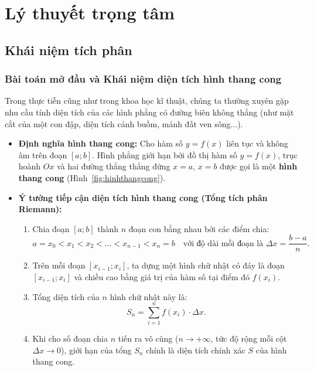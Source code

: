 \documentclass[12pt]{article}
\begin{document}
	\newpage
	
	\setcounter{tocdepth}{2}
	\tableofcontents
	\newpage
	
	\section{Lý thuyết trọng tâm}\label{sec:lythuyet}
	
	\subsection{Khái niệm tích phân}
	
	\subsubsection{Bài toán mở đầu và Khái niệm diện tích hình thang cong}
	
	Trong thực tiễn cũng như trong khoa học kĩ thuật, chúng ta thường xuyên gặp nhu cầu tính diện tích của các hình phẳng có đường biên không thẳng (như mặt cắt của một con đập, diện tích cánh buồm, mảnh đất ven sông...). 
	
	\begin{itemize}
		\item \textbf{Định nghĩa hình thang cong:} Cho hàm số $y = f(x)$ liên tục và không âm trên đoạn $[a; b]$. Hình phẳng giới hạn bởi đồ thị hàm số $y = f(x)$, trục hoành $Ox$ và hai đường thẳng thẳng đứng $x = a$, $x = b$ được gọi là một \textbf{hình thang cong} (Hình~\ref{fig:hinhthangcong}).
		
		\item \textbf{Ý tưởng tiếp cận diện tích hình thang cong (Tổng tích phân Riemann):}
		\begin{enumerate}[label=Bước \arabic*:]
			\item Chia đoạn $[a; b]$ thành $n$ đoạn con bằng nhau bởi các điểm chia:
			\[
			a = x_0 < x_1 < x_2 < \dots < x_{n-1} < x_n = b \quad \text{với độ dài mỗi đoạn là } \Delta x = \frac{b - a}{n}.
			\]
			\item Trên mỗi đoạn $[x_{i-1}; x_i]$, ta dựng một hình chữ nhật có đáy là đoạn $[x_{i-1}; x_i]$ và chiều cao bằng giá trị của hàm số tại điểm đó $f(x_i)$.
			\item Tổng diện tích của $n$ hình chữ nhật này là:
			\[
			S_n = \sum_{i=1}^{n} f(x_i) \cdot \Delta x.
			\]
			\item Khi cho số đoạn chia $n$ tiến ra vô cùng ($n \to +\infty$, tức độ rộng mỗi cột $\Delta x \to 0$), giới hạn của tổng $S_n$ chính là diện tích chính xác $S$ của hình thang cong.
		\end{enumerate}
	\end{itemize}
	
\end{document}
